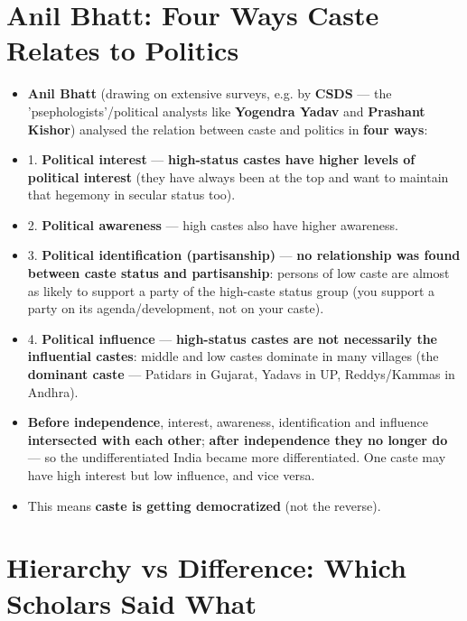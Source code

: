\section{Anil Bhatt: Four Ways Caste Relates to Politics}

\begin{KeyConcept}
\begin{itemize}
\item \textbf{Anil Bhatt} (drawing on extensive surveys, e.g. by \textbf{CSDS} --- the 'psephologists'/political analysts like \textbf{Yogendra Yadav} and \textbf{Prashant Kishor}) analysed the relation between caste and politics in \textbf{four ways}:
\item 1. \textbf{Political interest} --- \textbf{high-status castes have higher levels of political interest} (they have always been at the top and want to maintain that hegemony in secular status too).
\item 2. \textbf{Political awareness} --- high castes also have higher awareness.
\item 3. \textbf{Political identification (partisanship)} --- \textbf{no relationship was found between caste status and partisanship}: persons of low caste are almost as likely to support a party of the high-caste status group (you support a party on its agenda/development, not on your caste).
\item 4. \textbf{Political influence} --- \textbf{high-status castes are not necessarily the influential castes}: middle and low castes dominate in many villages (the \textbf{dominant caste} --- Patidars in Gujarat, Yadavs in UP, Reddys/Kammas in Andhra).
\end{itemize}
\end{KeyConcept}

\begin{KeyConcept}
\begin{itemize}
\item \textbf{Before independence}, interest, awareness, identification and influence \textbf{intersected with each other}; \textbf{after independence they no longer do} --- so the undifferentiated India became more differentiated. One caste may have high interest but low influence, and vice versa.
\item This means \textbf{caste is getting democratized} (not the reverse).
\end{itemize}
\end{KeyConcept}

\section{Hierarchy vs Difference: Which Scholars Said What}

